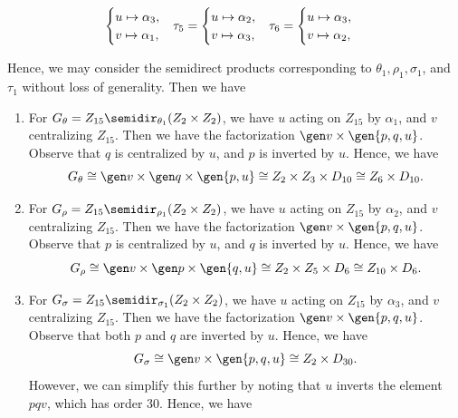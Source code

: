 \begin{solalph}
\begin{itemize}
\begin{itemize}
\[            \begin{cases}
                u \mapsto \alpha_3, \\
                v \mapsto \alpha_1,
            \end{cases} \hspace{-2pt}
            \tau_5 = 
            \begin{cases}
                u \mapsto \alpha_2, \\
                v \mapsto \alpha_3,
            \end{cases} \hspace{-2pt}
            \tau_6 =
            \begin{cases}
                u \mapsto \alpha_3, \\
                v \mapsto \alpha_2,
            \end{cases}\]
        \end{itemize}
        Hence, we may consider the semidirect products corresponding to $\theta_1, \rho_1, \sigma_1$, and $\tau_1$ without loss of generality. Then we have
        \begin{enumerate}
            \item For $G_\theta = Z_{15} \semidir_{\theta_1} (Z_2 \times Z_2)$, we have $u$ acting on $Z_{15}$ by $\alpha_1$, and $v$ centralizing $Z_{15}$. Then we have the factorization $\gen v \times \gen{p, q, u}$. Observe that $q$ is centralized by $u$, and $p$ is inverted by $u$. Hence, we have
            \[G_\theta \cong \gen v \times \gen q \times \gen{p, u} \cong Z_2 \times Z_3 \times D_{10} \cong Z_6 \times D_{10}.\]
            \item For $G_\rho = Z_{15} \semidir_{\rho_1} (Z_2 \times Z_2)$, we have $u$ acting on $Z_{15}$ by $\alpha_2$, and $v$ centralizing $Z_{15}$. Then we have the factorization $\gen v \times \gen{p, q, u}$. Observe that $p$ is centralized by $u$, and $q$ is inverted by $u$. Hence, we have
            \[G_\rho \cong \gen v \times \gen p \times \gen{q, u} \cong Z_2 \times Z_5 \times D_6 \cong Z_{10} \times D_6.\]
            \item For $G_\sigma = Z_{15} \semidir_{\sigma_1} (Z_2 \times Z_2)$, we have $u$ acting on $Z_{15}$ by $\alpha_3$, and $v$ centralizing $Z_{15}$. Then we have the factorization $\gen v \times \gen{p, q, u}$. Observe that both $p$ and $q$ are inverted by $u$. Hence, we have
            \[G_\sigma \cong \gen v \times \gen{p, q, u} \cong Z_2 \times D_{30}.\]
            However, we can simplify this further by noting that $u$ inverts the element $pqv$, which has order 30. Hence, we have

\end{enumerate}
\end{itemize}
\end{solalph}

